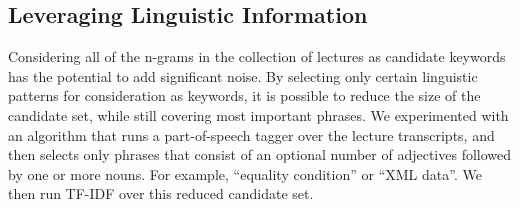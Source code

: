 \subsection{Leveraging Linguistic Information}
\label{sec:useTime}


Considering all of the n-grams in the collection of lectures as candidate keywords has the potential to add significant noise. By selecting only certain linguistic patterns for consideration as keywords, it is possible to reduce the size of the candidate set, while still covering most important phrases. We experimented with an algorithm that runs a part-of-speech tagger over the lecture transcripts, and then selects only phrases that consist of an optional number of adjectives followed by one or more nouns. For example, ``equality condition'' or ``XML data''. We then run TF-IDF over this reduced candidate set.
